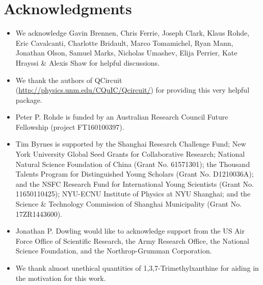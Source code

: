 %
%

\section*{Acknowledgments}

\begin{itemize}
\item We acknowledge Gavin Brennen, Chris Ferrie, Joseph Clark, Klaus Rohde, Eric Cavalcanti, Charlotte Bridault, Marco Tomamichel, Ryan Mann, Jonathan Olson, Samuel Marks, Nicholas Umashev, Elija Perrier, Kate Hrayssi \& Alexis Shaw for helpful discussions.
\item We thank the authors of QCircuit (\url{http://physics.unm.edu/CQuIC/Qcircuit/}) for providing this very helpful package.
\item Peter P. Rohde is funded by an Australian Research Council Future Fellowship (project FT160100397).
\item Tim Byrnes is supported by the Shanghai Research Challenge Fund; New York University Global Seed Grants for Collaborative Research; National Natural Science Foundation of China (Grant No. 61571301); the Thousand Talents Program for Distinguished Young Scholars (Grant No. D1210036A); and the NSFC Research Fund for International Young Scientists (Grant No. 11650110425); NYU-ECNU Institute of Physics at NYU Shanghai; and the Science \& Technology Commission of Shanghai Municipality (Grant No. 17ZR1443600).
\item Jonathan P. Dowling would like to acknowledge support from the US Air Force Office of Scientific Research, the Army Research Office, the National Science Foundation, and the Northrop-Grumman Corporation.
\item We thank almost unethical quantities of 1,3,7-Trimethylxanthine for aiding in the motivation for this work.
\end{itemize}